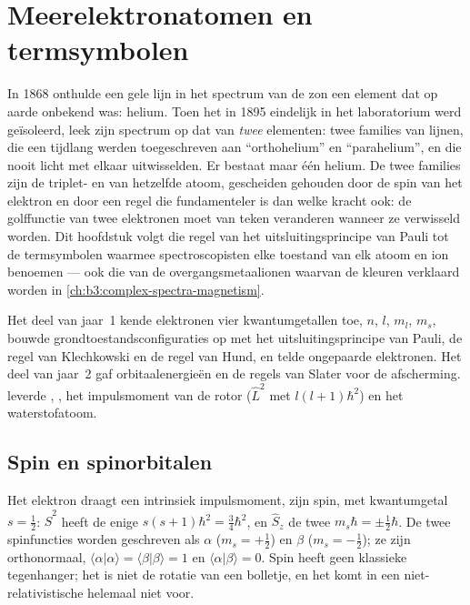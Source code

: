 \chapter{Meerelektronatomen en termsymbolen}\label{ch:b3:many-electron-atoms}

In 1868 onthulde een gele lijn in het spectrum van de zon een element dat
op aarde onbekend was: helium. Toen het in 1895 eindelijk in het
laboratorium werd geïsoleerd, leek zijn spectrum op dat van \emph{twee}
elementen: twee families van
lijnen, die een tijdlang werden toegeschreven aan ``orthohelium'' en
``parahelium'', en die nooit licht met elkaar uitwisselden. Er bestaat maar
één helium. De twee families zijn de triplet- en  van
hetzelfde atoom, gescheiden gehouden door de spin van het elektron en door
een regel die fundamenteler is dan welke kracht ook: de golffunctie van
twee elektronen moet van teken veranderen wanneer ze verwisseld worden.
Dit hoofdstuk volgt die regel van het uitsluitingsprincipe van Pauli tot
de termsymbolen waarmee spectroscopisten elke toestand van elk atoom en
ion benoemen --- ook die van de overgangsmetaalionen waarvan de kleuren
verklaard worden
in \cref{ch:b3:complex-spectra-magnetism}.

\begin{recall}
Het deel van jaar~1 kende elektronen vier kwantumgetallen toe, $n$, $l$,
$m_l$, $m_s$, bouwde grondtoestandsconfiguraties op met het
uitsluitingsprincipe van Pauli, de regel van Klechkowski en de regel van
Hund, en telde ongepaarde elektronen. Het deel van jaar~2
gaf orbitaalenergieën en de regels van Slater voor de afscherming.
 leverde , , het
impulsmoment van de rotor ($\hat L^2$ met  $l(l+1)\hbar^2$) en het
waterstofatoom.
\end{recall}

\section{Spin en spinorbitalen}

Het elektron draagt een intrinsiek impulsmoment, zijn spin, met
kwantumgetal $s = \frac12$: $\hat S^2$ heeft de enige  $s(s+1)\hbar^2 =
\frac34\hbar^2$, en $\hat S_z$ de twee  $m_s\hbar = \pm\frac12\hbar$.
De twee spinfuncties worden geschreven als $\alpha$ ($m_s = +\frac12$) en $\beta$
($m_s = -\frac12$); ze zijn orthonormaal, $\langle\alpha|\alpha\rangle =
\langle\beta|\beta\rangle = 1$ en $\langle\alpha|\beta\rangle = 0$. Spin heeft
geen klassieke tegenhanger; het is niet de rotatie van een bolletje, en het
komt in een niet-relativistische  helemaal niet voor.

